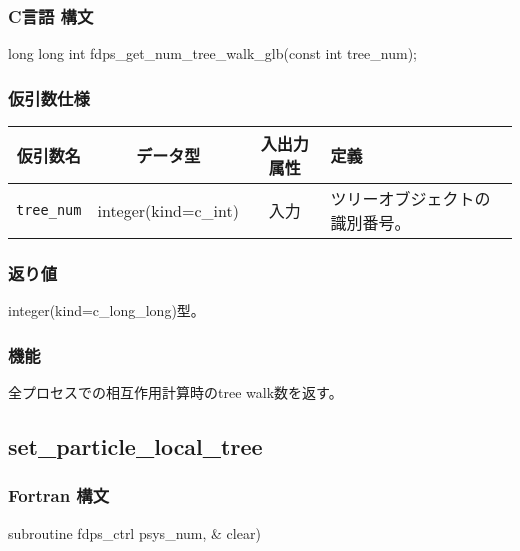 \subsubsection*{C言語 構文}
\begin{screen}
\begin{spverbatim}
long long int fdps_get_num_tree_walk_glb(const int tree_num);
\end{spverbatim}
\end{screen}

\subsubsection*{仮引数仕様}
\begin{table}[h]
\begin{tabularx}{\linewidth}{cccX}
\toprule
\rowcolor{Snow2}
仮引数名 & データ型 & 入出力属性 & 定義 \\
\midrule
\verb|tree_num|  & integer(kind=c\_int)   & 入力     & ツリーオブジェクトの識別番号。\\
\bottomrule
\end{tabularx}
\end{table}

\subsubsection*{返り値}
integer(kind=c\_long\_long)型。

\subsubsection*{機能}
全プロセスでの相互作用計算時のtree walk数を返す。
\clearpage

\subsection{set\_particle\_local\_tree}
\subsubsection*{Fortran 構文}
\begin{screen}
\begin{spverbatim}  
subroutine fdps_ctrl%
                                             psys_num, &
                                             clear)
\end{spverbatim}
\end{screen}

